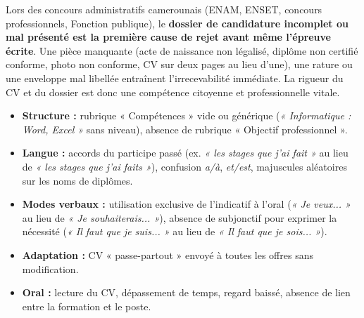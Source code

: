 \documentclass[11pt]{article}
\begin{document}
\begin{savaistu}
Lors des concours administratifs camerounais (ENAM, ENSET, concours professionnels, Fonction publique), le \textbf{dossier de candidature incomplet ou mal présenté est la première cause de rejet avant même l'épreuve écrite}. Une pièce manquante (acte de naissance non légalisé, diplôme non certifié conforme, photo non conforme, CV sur deux pages au lieu d'une), une rature ou une enveloppe mal libellée entraînent l'irrecevabilité immédiate. La rigueur du CV et du dossier est donc une compétence citoyenne et professionnelle vitale.
\end{savaistu}

\begin{aretenir}
\begin{itemize}
    \item \textbf{Structure :} rubrique « Compétences » vide ou générique (\emph{« Informatique : Word, Excel »} sans niveau), absence de rubrique « Objectif professionnel ».
    \item \textbf{Langue :} accords du participe passé (ex. \emph{« les stages que j'ai fait »} au lieu de \emph{« les stages que j'ai faits »}), confusion \emph{a/à}, \emph{et/est}, majuscules aléatoires sur les noms de diplômes.
    \item \textbf{Modes verbaux :} utilisation exclusive de l'indicatif à l'oral (\emph{« Je veux... »} au lieu de \emph{« Je souhaiterais... »}), absence de subjonctif pour exprimer la nécessité (\emph{« Il faut que je suis... »} au lieu de \emph{« Il faut que je sois... »}).
    \item \textbf{Adaptation :} CV « passe-partout » envoyé à toutes les offres sans modification.
    \item \textbf{Oral :} lecture du CV, dépassement de temps, regard baissé, absence de lien entre la formation et le poste.
\end{itemize}
\end{aretenir}
\end{document}

